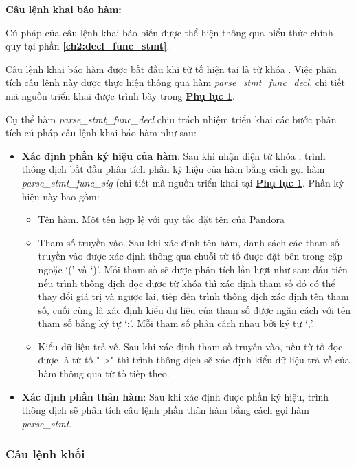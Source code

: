 \noindent\textbf{Câu lệnh khai báo hàm:}

Cú pháp của câu lệnh khai báo biến được thể hiện thông qua biểu thức chính quy tại phần \textbf{\ref{ch2:decl_func_stmt}}.

Câu lệnh khai báo hàm được bắt đầu khi từ tố hiện tại là từ khóa . Việc phân tích câu lệnh này được thực hiện thông qua hàm \textit{parse\_stmt\_func\_decl}, chi tiết mã nguồn triển khai được trình bày trong \hyperref[ap1:stmt_decl_fun]{\bf Phụ lục 1}. %

Cụ thể hàm \textit{parse\_stmt\_func\_decl} chịu trách nhiệm triển khai các bước phân tích cú pháp câu lệnh khai báo hàm như sau:

\begin{itemize}
    \item \textbf{Xác định phần ký hiệu của hàm}: Sau khi nhận diện từ khóa , trình thông dịch bắt đầu phân tích phần ký hiệu của hàm bằng cách gọi hàm \textit{parse\_stmt\_func\_sig} (chi tiết mã nguồn triển khai tại \hyperref[ap1:stmt_decl_fun_sig]{\bf Phụ lục 1}. %
    Phần ký hiệu này bao gồm:
    \begin{itemize}
        \item Tên hàm. Một tên hợp lệ với quy tắc đặt tên của Pandora
        \item Tham số truyền vào. Sau khi xác định tên hàm, danh sách các tham số truyền vào được xác định thông qua chuỗi từ tố được đặt bên trong cặp ngoặc `(' và `)'. Mỗi tham số sẽ được phân tích lần lượt như sau: đầu tiên nếu trình thông dịch đọc được từ khóa  thì xác định tham số đó có thể thay đổi giá trị và ngược lại, tiếp đến trình thông dịch xác định tên tham số, cuối cùng là xác định kiểu dữ liệu của tham số được ngăn cách với tên tham số bằng ký tự `:'. Mỗi tham số phân cách nhau bởi ký tư `,'.
        \item Kiểu dữ liệu trả về. Sau khi xác định tham số truyền vào, nếu từ tố đọc được là từ tố "->" thì trình thông dịch sẽ xác định kiểu dữ liệu trả về của hàm thông qua từ tố tiếp theo.
    \end{itemize}
    \item \textbf{Xác định phần thân hàm}: Sau khi xác định được phần ký hiệu, trình thông dịch sẽ phân tích câu lệnh phần thân hàm bằng cách gọi hàm \textit{parse\_stmt}.
\end{itemize}

\subsubsection{Câu lệnh khối}

